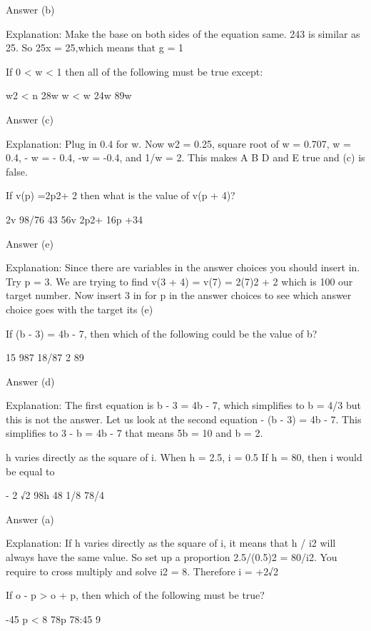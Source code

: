     Answer (b)

    Explanation: Make the base on both sides of the equation  same. 243 is similar as 25. So 25x  = 25,which means that g = 1

    If 0 < w < 1 then all of the following must be true except:

        w2 < n
           28w
        w < w
           24w
           89w 

    Answer (c)

    Explanation: Plug in 0.4 for w. Now w2 = 0.25, square root of w = 0.707, w = 0.4, - w = - 0.4, -w = -0.4, and 1/w = 2. This makes A B D and E true and (c) is false.

    If v(p) =2p2+ 2 then what is the value of v(p + 4)?

        2v
        98/76
        43
        56v
        2p2+ 16p +34 

    Answer (e)

    Explanation: Since there are variables in the answer choices you should insert in. Try p = 3. We are trying to find v(3 + 4) = v(7) = 2(7)2 + 2 which is 100 our target number. Now insert 3 in for p in the answer choices to see which answer choice goes with the target its (e)

    If (b - 3) = 4b - 7, then which of the following could be the value of b?

        15
        987
        18/87
        2
        89 

    Answer (d)

    Explanation: The first equation is b - 3 = 4b - 7, which simplifies to b = 4/3 but this is not the answer. Let us look at the second equation - (b - 3) = 4b - 7. This simplifies to 3 - b = 4b - 7 that means 5b = 10 and b = 2. 



    h varies directly as the square of i. When h = 2.5, i = 0.5 If h = 80, then i would be equal to

        - 2 √2
        98h
        48
        1/8
        78/4 

    Answer (a)

    Explanation: If h varies directly as the square of i, it means that h / i2 will always have the same value. So set up a proportion 2.5/(0.5)2 = 80/i2. You require to cross multiply and solve i2 = 8. Therefore i = +2√2

    If o - p > o + p, then which of the following must be true?

        -45
        p < 8
        78p
        78:45
        9 

